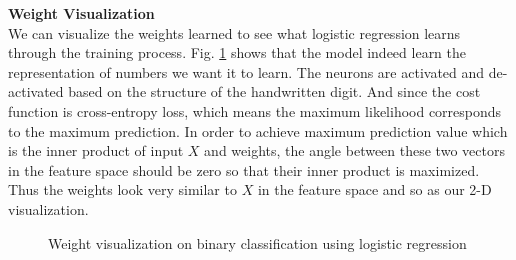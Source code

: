 \documentclass{article} %
\begin{document}
\textbf{Weight Visualization}\\
We can visualize the weights learned to see what logistic regression learns through the training process. Fig. \ref{fig:P4} shows that the model indeed learn the representation of numbers we want it to learn. The neurons are activated and de-activated based on the structure of the handwritten digit. And since the cost function is cross-entropy loss, which means the maximum likelihood corresponds to the maximum prediction. In order to achieve maximum prediction value which is the inner product of input $X$ and weights, the angle between these two vectors in the feature space should be zero so that their inner product is maximized. Thus the weights look very similar to $X$ in the feature space and so as our 2-D visualization.
\begin{figure}%
	\centering
	\qquad
	\qquad
	\caption{Weight visualization on binary classification using logistic regression}%
	\label{fig:P4}%
\end{figure}
\end{document}
